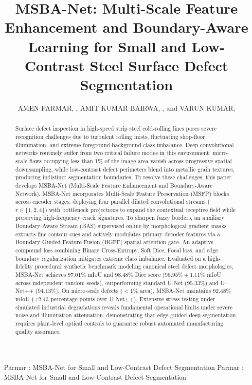 \documentclass{ieeeaccess}
\begin{document}

\title{MSBA-Net: Multi-Scale Feature Enhancement and Boundary-Aware Learning for Small and Low-Contrast Steel Surface Defect Segmentation}

\author{\uppercase{Amen Parmar}, ,
\uppercase{Amit Kumar Bairwa}, ,
and \uppercase{Varun Kumar}, }

\address[1]{Department of Computer Science and Engineering, Manipal University Jaipur, Jaipur, Rajasthan 303007, India}

\markboth
{Parmar \headeretal: MSBA-Net for Small and Low-Contrast Defect Segmentation}
{Parmar \headeretal: MSBA-Net for Small and Low-Contrast Defect Segmentation}


\begin{abstract}
Surface defect inspection in high-speed strip steel cold-rolling lines poses severe recognition challenges due to turbulent rolling mists, fluctuating shop-floor illumination, and extreme foreground-background class imbalance. Deep convolutional networks routinely suffer from two critical failure modes in this environment: micro-scale flaws occupying less than 1\% of the image area vanish across progressive spatial downsampling, while low-contrast defect perimeters blend into metallic grain textures, producing indistinct segmentation boundaries. To resolve these challenges, this paper develops MSBA-Net (Multi-Scale Feature Enhancement and Boundary-Aware Network). MSBA-Net incorporates Multi-Scale Feature Preservation (MSFP) blocks across encoder stages, deploying four parallel dilated convolutional streams ($r \in \{1, 2, 4\}$) with bottleneck projections to expand the contextual receptive field while preserving high-frequency crack signatures. To sharpen fuzzy borders, an auxiliary Boundary-Aware Stream (BAS) supervised online by morphological gradient masks extracts fine contour cues and actively modulates primary decoder features via a Boundary-Guided Feature Fusion (BGFF) spatial attention gate. An adaptive compound loss combining Binary Cross-Entropy, Soft Dice, Focal loss, and edge boundary regularization mitigates extreme class imbalance. Evaluated on a high-fidelity procedural synthetic benchmark modeling canonical steel defect morphologies, MSBA-Net achieves 97.01\% mIoU and 98.48\% Dice score ($96.95\% \pm 1.11\%$ mIoU across independent random seeds), outperforming standard U-Net (95.33\%) and U-Net++ (94.13\%). On micro-scale defects ($<1\%$ area), MSBA-Net maintains 92.48\% mIoU (+2.43 percentage points over U-Net++). Extensive stress-testing under simulated industrial degradations reveals fundamental operational limits under severe noise and illumination attenuation, demonstrating that edge-guided deep segmentation requires plant-level optical controls to guarantee robust automated manufacturing quality assurance.
\end{abstract}
\end{document}
